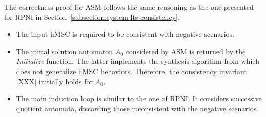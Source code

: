 The correctness proof for ASM follows the same reasoning as the one presented for RPNI in Section~\ref{subsection:system-lts-consistency}.
\begin{itemize}
\item The input hMSC is required to be consistent with negative scenarios.
\item The initial solution automaton $A_0$ considered by ASM is returned by the \emph{Initialize} function. The latter implements the synthesis algorithm from \cite{Uchitel:2003} which does not generalize hMSC behaviors. Therefore, the consistency invariant \ref{XXX} initially holds for $A_0$.
\item The main induction loop is similar to the one of RPNI. It considers successive quotient automata, discarding those inconsistent with the negative scenarios.
\end{itemize}
